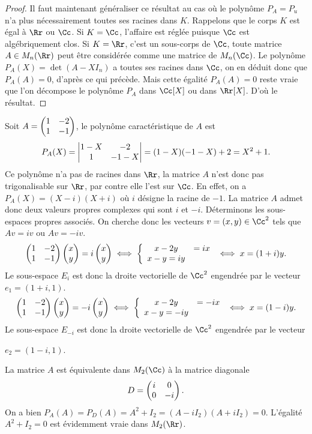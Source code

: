 \documentclass[class=report,crop=false]{standalone}
\begin{document}
\begin{proof}
Il faut maintenant généraliser ce résultat au cas où le polynôme $P_A=P_u$ 
n'a plus nécessairement toutes ses racines dans $K$. Rappelons que le corps $K$ 
est égal à $\Rr$ ou $\Cc$. Si $K=\Cc$, l'affaire est réglée puisque $\Cc$ est 
algébriquement clos. Si $K=\Rr$, c'est un sous-corps de $\Cc$, toute matrice 
$A\in M_n(\Rr)$ peut être considérée comme une matrice de $M_n(\Cc)$. 
Le polynôme $P_A(X)=\det(A-XI_n)$ a toutes ses racines dans $\Cc$, on en 
déduit donc que $P_A(A)=0$, d'après ce qui précède. Mais cette égalité $P_A(A)=0$ 
reste vraie que l'on décompose le polynôme $P_A$ dans $\Cc[X]$ ou dans $\Rr[X]$. 
D'où le résultat.
\end{proof}


\begin{exemple}
Soit $A=\left(\begin{matrix}1&-2\cr1&-1\end{matrix}\right)$, le polynôme caractéristique de $A$ est 
$$P_A(X)=\left|\begin{matrix}1-X&-2\cr 1&-1-X\end{matrix}\right|=(1-X)(-1-X)+2=X^2+1.$$
Ce polynôme n'a pas de racines dans $\Rr$,  la matrice $A$ n'est donc pas trigonalisable sur $\Rr$, par contre elle l'est sur $\Cc$. En effet, on a $P_A(X)=(X-i)(X+i)$ où $i$ désigne la racine de $-1$. La matrice $A$ admet donc deux valeurs propres complexes qui sont $i$ et $-i$. Déterminons les sous-espaces propres associés. On cherche donc les vecteurs $v=(x,y)\in\Cc^2$ tels que $Av=iv$  ou $Av=-iv$.
$$\left(\begin{matrix}1&-2\cr1&-1\end{matrix}\right)\left(\begin{matrix}x\cr y\end{matrix}\right)
=i\left(\begin{matrix}x\cr y\end{matrix}\right)\iff\left\{\begin{array}{cc}x-2y&=ix\cr x-y=iy\end{array}\right.
\iff x=(1+i)y.$$
Le sous-espace $E_i$ est donc la droite vectorielle de $\Cc^2$ engendrée par le vecteur $e_1=(1+i,1)$. 
$$\left(\begin{matrix}1&-2\cr1&-1\end{matrix}\right)\left(\begin{matrix}x\cr y\end{matrix}\right)
=-i\left(\begin{matrix}x\cr y\end{matrix}\right)\iff\left\{\begin{array}{cc}x-2y&=-ix\cr x-y=-iy\end{array}\right.
\iff x=(1-i)y.$$
Le sous-espace $E_{-i}$ est donc la droite vectorielle de $\Cc^2$ engendrée par le vecteur 

$e_2=(1-i,1)$.

La matrice $A$ est équivalente dans $M_2(\Cc)$ à la matrice diagonale
$$D=\left(\begin{matrix}i&0\cr0&-i\end{matrix}\right).$$
On a bien $P_A(A)=P_D(A)=A^2+I_2=(A-iI_2)(A+iI_2)=0$. L'égalité $A^2+I_2=0$ est évidemment vraie dans $M_2(\Rr)$.
\end{exemple}
\end{document}

